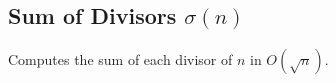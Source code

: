 \subsection{Sum of Divisors $\sigma (n)$}

Computes the sum of each divisor of $n$ in $O(\sqrt{n})$.

